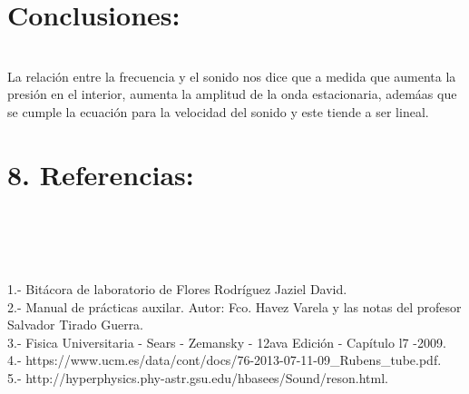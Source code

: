 \documentclass[10pt,a4paper]{article}
\begin{document}
\section*{ Conclusiones:}\\
La relaci\'{o}n entre la frecuencia y el sonido nos dice que a medida que aumenta la presi\'{o}n en el interior, aumenta la amplitud de la onda estacionaria, adem\'{aa}s que se cumple la ecuaci\'{o}n para la velocidad del sonido y este tiende a ser lineal.

\section*{8. Referencias:}\\
\\
\\
\\1.- Bit\'{a}cora de laboratorio de Flores Rodr\'{i}guez Jaziel David.
\\
2.- Manual de pr\'{a}cticas auxilar. Autor: Fco. Havez Varela y las notas del profesor Salvador Tirado Guerra.
\\
3.- Fisica Universitaria - Sears - Zemansky - 12ava Edici\'{o}n - Cap\'{i}tulo l7 -2009.\\
4.- https://www.ucm.es/data/cont/docs/76-2013-07-11-09_Rubens_tube.pdf.\\ 
5.- http://hyperphysics.phy-astr.gsu.edu/hbasees/Sound/reson.html.\\
\\
\end{document}
